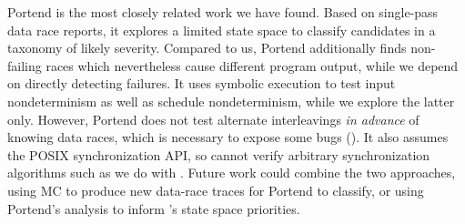Portend \cite{portend} is the most closely related work we have found.
Based on single-pass data race reports, it explores a limited state space to classify candidates in a taxonomy of likely severity.
Compared to us, Portend additionally finds non-failing races which nevertheless cause
different program output, while we depend on directly detecting failures.
It uses symbolic execution to test input nondeterminism as well as schedule nondeterminism,
while we explore the latter only.
However, Portend does not test alternate interleavings {\em in advance} of knowing data races,
which is necessary to expose some bugs (\sect{\ref{sec:eval-falseneg}}).
It also assumes the POSIX synchronization API, so cannot verify arbitrary synchronization algorithms such as we do with \mxtest.
Future work could combine the two approaches, using MC to produce new data-race traces for Portend to classify, or using Portend's analysis to inform \quicksand's state space priorities.

%





